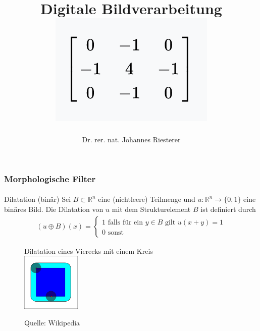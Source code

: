 \documentclass{beamer}
\begin{document}
\title[Digitale Bildverarbeitung] %
{Digitale Bildverarbeitung
\\
\includegraphics[scale=1.0]{img/cover}
}
\subtitle{}
\author[Dr. Johannes Riesterer] %
{Dr.  rer. nat. Johannes Riesterer}

\date[KPT 2004] %
{}

\subject{Digitale Bildverarbeitung}

\frame{\titlepage}


\begin{frame}
    \frametitle{Morphologische Filter}
\framesubtitle{}

\begin{block}{Dilatation (binär)}
Sei $B \subset \mathbb{R}^n$ eine (nichtleere) Teilmenge und $u : \mathbb{R}^n \to \{ 0,1 \}$ eine binäres Bild.  Die Dilatation von $u$ mit dem Strukturelement $B$ ist definiert durch
\begin{align*}
(u \oplus B)(x) = \begin{cases} 1 \text{ falls für ein $y \in B$ gilt } u(x + y )= 1 \\ 0 \text{ sonst} \end{cases}
\end{align*}
\end{block}
\begin{figure}[htp]
      \centering
Dilatation eines Vierecks mit einem Kreis \\
    \includegraphics[width=0.25\textwidth]{img/Dilation} 
      \caption{Quelle: Wikipedia}
\end{figure}

 \end{frame}
\end{document}
